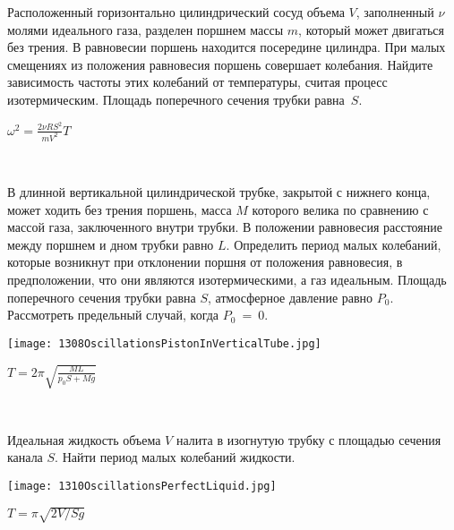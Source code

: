 \begin{ex} Расположенный горизонтально цилиндрический сосуд объема $V$, заполненный $\nu$ молями идеального газа, 
разделен поршнем массы $m$, который может двигаться без трения. В равновесии поршень находится посередине цилиндра. 
При малых смещениях из положения равновесия поршень совершает колебания. Найдите зависимость частоты этих колебаний от температуры, 
считая процесс изотермическим. Площадь поперечного сечения трубки равна~$S$.
\begin{ans}
$\omega^2=\frac{2\nu R S^2}{mV^2}T$
\end{ans}
\end{ex}

\begin{ex}
\hspace{0pt} \\
\begin{minipage}{.65\textwidth} 
В длинной вертикальной цилиндрической трубке, закрытой с нижнего конца, может ходить без трения поршень, 
масса $M$ которого велика по сравнению с массой газа, заключенного внутри трубки. В положении равновесия расстояние между поршнем и дном трубки равно $L$. 
Определить период малых колебаний, которые возникнут при отклонении поршня от положения равновесия, в предположении, что они являются изотермическими, 
а газ идеальным. Площадь поперечного сечения трубки равна $S$, атмосферное давление равно $P_0$. Рассмотреть предельный случай, когда $P_0$~=~0.
\end{minipage}
\begin{minipage}{.35\textwidth}
\centering
\texttt{[image: 1308OscillationsPistonInVerticalTube.jpg]}
\end{minipage}
\begin{ans}
$T=2\pi\sqrt{\frac{ML}{p_0S + Mg}}$
\end{ans}
\end{ex}

\begin{ex}
\hspace{0pt} \\
\begin{minipage}{.65\textwidth} 
Идеальная жидкость объема $V$ налита в изогнутую трубку с площадью сечения канала $S$. Найти период малых колебаний жидкости.
\end{minipage}
\begin{minipage}{.35\textwidth}
\centering
\texttt{[image: 1310OscillationsPerfectLiquid.jpg]}
\end{minipage}
\begin{ans}
$T=\pi \sqrt{2V/Sg}$
\end{ans}
\end{ex}


